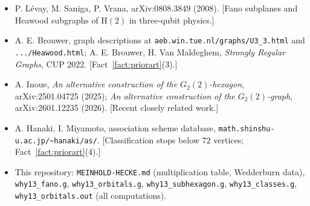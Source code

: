 \documentclass[11pt]{article}
\theoremstyle{definition}
\newcommand{\PSL}{\mathrm{PSL}}
\begin{document}
\begin{itemize}
{geometries and fused amalgams}, J.\ Group Theory 11 (2008),
arXiv:0708.3515. [$\PSL(2,7)$-substructures of $G_2$-geometries.]
\item P. L\'evay, M. Saniga, P. Vrana, arXiv:0808.3849 (2008). [Fano
subplanes and Heawood subgraphs of $\mathrm H(2)$ in three-qubit physics.]
\item A. E. Brouwer, graph descriptions at
\texttt{aeb.win.tue.nl/graphs/U3\_3.html} and
\texttt{.../Heawood.html}; A. E. Brouwer, H. Van Maldeghem,
\emph{Strongly Regular Graphs}, CUP 2022. [Fact~\ref{fact:priorart}(3).]
\item A. Inoue, \emph{An alternative construction of the $G_2(2)$-hexagon},
arXiv:2501.04725 (2025); \emph{An alternative construction of the
$G_2(2)$-graph}, arXiv:2601.12235 (2026). [Recent closely related work.]
\item A. Hanaki, I. Miyamoto, association scheme database,
\texttt{math.shinshu-u.ac.jp/\textasciitilde hanaki/as/}. [Classification
stops below $72$ vertices; Fact~\ref{fact:priorart}(4).]
\item This repository: \texttt{MEINHOLD-HECKE.md} (multiplication table,
Wedderburn data), \texttt{why13\_fano.g}, \texttt{why13\_orbitals.g},
\texttt{why13\_subhexagon.g}, \texttt{why13\_classes.g},
\texttt{why13\_orbitals.out} (all computations).
\end{itemize}
\end{document}
